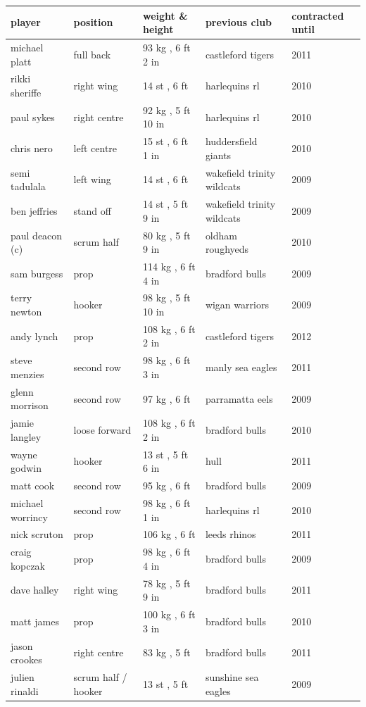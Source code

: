 \documentclass{article}
\begin{document}
\begin{tabular}{lllll}
\toprule
player & position & weight \& height & previous club & contracted until \\
\midrule
michael platt & full back & 93 kg , 6 ft 2 in & castleford tigers & 2011 \\
rikki sheriffe & right wing & 14 st , 6 ft & harlequins rl & 2010 \\
paul sykes & right centre & 92 kg , 5 ft 10 in & harlequins rl & 2010 \\
chris nero & left centre & 15 st , 6 ft 1 in & huddersfield giants & 2010 \\
semi tadulala & left wing & 14 st , 6 ft & wakefield trinity wildcats & 2009 \\
ben jeffries & stand off & 14 st , 5 ft 9 in & wakefield trinity wildcats & 2009 \\
paul deacon (c) & scrum half & 80 kg , 5 ft 9 in & oldham roughyeds & 2010 \\
sam burgess & prop & 114 kg , 6 ft 4 in & bradford bulls & 2009 \\
terry newton & hooker & 98 kg , 5 ft 10 in & wigan warriors & 2009 \\
andy lynch & prop & 108 kg , 6 ft 2 in & castleford tigers & 2012 \\
steve menzies & second row & 98 kg , 6 ft 3 in & manly sea eagles & 2011 \\
glenn morrison & second row & 97 kg , 6 ft & parramatta eels & 2009 \\
jamie langley & loose forward & 108 kg , 6 ft 2 in & bradford bulls & 2010 \\
wayne godwin & hooker & 13 st , 5 ft 6 in & hull & 2011 \\
matt cook & second row & 95 kg , 6 ft & bradford bulls & 2009 \\
michael worrincy & second row & 98 kg , 6 ft 1 in & harlequins rl & 2010 \\
nick scruton & prop & 106 kg , 6 ft & leeds rhinos & 2011 \\
craig kopczak & prop & 98 kg , 6 ft 4 in & bradford bulls & 2009 \\
dave halley & right wing & 78 kg , 5 ft 9 in & bradford bulls & 2011 \\
matt james & prop & 100 kg , 6 ft 3 in & bradford bulls & 2010 \\
jason crookes & right centre & 83 kg , 5 ft & bradford bulls & 2011 \\
julien rinaldi & scrum half / hooker & 13 st , 5 ft & sunshine sea eagles & 2009 \\

\end{tabular}
\end{document}

